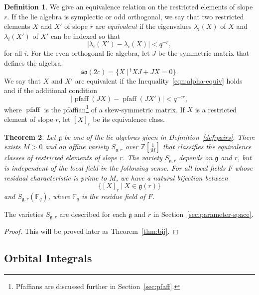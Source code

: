 \documentclass[11pt]{amsart}
\newtheorem{theorem}{Theorem}[section]
\theoremstyle{definition}
\newtheorem{definition}[theorem]{Definition}
\theoremstyle{remark}
\numberwithin{equation}{theorem}
\def\f{{\mathbb{F}_q}}
\def\tq{{\ \vert\ }}
\newcommand{\ring}[1]{\mathbb{#1}}
\def\op#1{\operatorname{#1}}
\def\lie#1{{\mathfrak{#1}}}
\def\liegood#1{{\lie#1}}
\begin{document}
\begin{definition}\label{def:equiv}
We give an equivalence relation on the restricted elements of
slope $r$.  If the lie algebra is symplectic or odd orthogonal, we
say that two restricted  elements $X$ and $X'$ of slope $r$ are
{\it equivalent\/} if the eigenvalues $\lambda_i(X)$ of $X$ and
$\lambda_i(X')$ of $X'$ can be indexed so that
   \begin{equation}
   |\lambda_i(X')-\lambda_i(X)|< q^{-r},
   \label{eqn:alpha-equiv}
   \end{equation}
for all $i$.  For the even orthogonal lie algebra, let $J$ be the
symmetric matrix that defines the algebra:
    $$
    \lie{so}(2c) = \{X \tq {}^tX J + J X = 0\}.
    $$
We say that $X$ and $X'$ are equivalent if the
Inequality~\ref{eqn:alpha-equiv} holds and if the additional
condition
   \begin{equation}
   |\op{pfaff}(JX) - \op{pfaff}(J X')| < q^{-c r},
   \end{equation}
where $\op{pfaff}$ is the pfaffian\footnote{Pfaffians are
discussed further in Section~\ref{sec:pfaff}.} of a skew-symmetric
matrix. If $X$ is a restricted  element of slope $r$, let $[X]_r$
be its equivalence class.
\end{definition}

\begin{theorem} \label{thm:equiv-class}
Let $\lie{g}$ be one of the lie algebras given in
Definition~\ref{def:pairs}.  There exists $M>0$ and an affine
variety $S_{\lie{g},r}$ over $\ring{Z}[\frac{1}{M}]$ that
classifies the equivalence classes of restricted  elements of
slope $r$. The variety $S_{\lie{g},r}$ depends on $\lie{g}$ and
$r$, but is independent of the local field in the following sense.
For all local fields $F$ whose residual characteristic is prime to
$M$, we have a natural bijection between
  \begin{equation}
  \{[X]_r \tq X\in \liegood{g}(r) \}
  \end{equation}
and $S_{\lie{g},r}(\f)$, where $\f$ is the residue field of $F$.
\end{theorem}

The varieties $S_{\lie{g},r}$ are described for each $\lie{g}$ and
$r$ in Section~\ref{sec:parameter-space}.

\begin{proof} This will be proved later as Theorem~\ref{thm:bij}.
\end{proof}


\subsection{Orbital Integrals}
\end{document}

